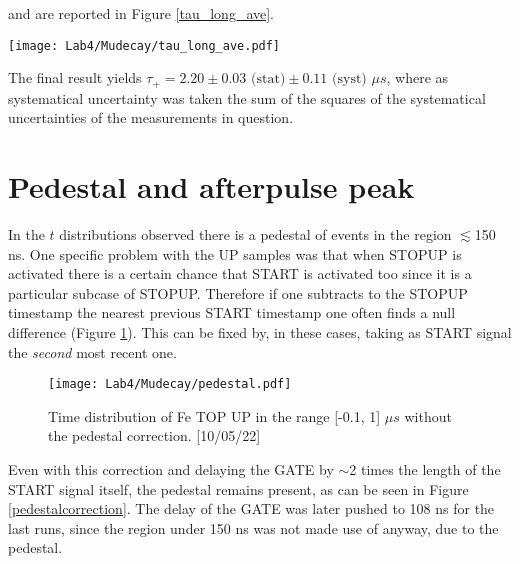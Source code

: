 \documentclass[10pt,a4paper,twocolumn]{article}
\begin{document}
and are reported in Figure \ref{tau_long_ave}.

\begin{figure*}[h!]
\centering
\caption{Combined estimates of $\tau_+$. [10-11-12-17-18-19-25-26-27-30/05/22]}
\texttt{[image: Lab4/Mudecay/tau\_long\_ave.pdf]} 
\label{tau_long_ave}
\end{figure*}

The final result yields $\tau_+ = 2.20 \pm 0.03 \text{ (stat)} \pm 0.11 \text{ (syst) }\mu s$, where as systematical uncertainty was taken the sum of the squares of the systematical uncertainties of the measurements in question. 

\section{Pedestal and afterpulse peak}

In the $t$ distributions observed there is a pedestal of events in the region $\lesssim$150 ns. One specific problem with the UP samples was that when STOPUP is activated there is a certain chance that START is activated too since it is a particular subcase of STOPUP. Therefore if one subtracts to the STOPUP timestamp the nearest previous START timestamp one often finds a null difference (Figure \ref{pedestalnocorrection}). This can be fixed by, in these cases, taking as START signal the \textit{second} most recent one.

\begin{figure}[h!]
\centering
\caption{Time distribution of Fe TOP UP in the range [-0.1, 1] $\mu s$ without the pedestal correction. [10/05/22]}

\texttt{[image: Lab4/Mudecay/pedestal.pdf]} 
\label{pedestalnocorrection}
\end{figure}

Even with this correction and delaying the GATE by $\sim$2 times the length of the START signal itself, the pedestal remains present, as can be seen in Figure \ref{pedestalcorrection}. The delay of the GATE was later pushed to 108 ns for the last runs, since the region under 150 ns was not made use of anyway, due to the pedestal. 
\end{document}
